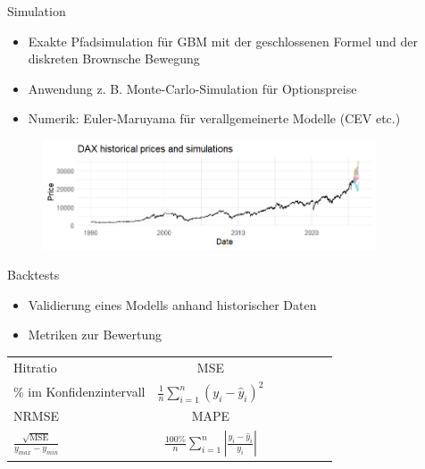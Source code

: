 \documentclass{beamer}
\begin{document}
\begin{frame}{Simulation}
  \begin{itemize}
      \item Exakte Pfadsimulation für GBM mit der geschlossenen Formel und der diskreten Brownsche Bewegung
      \item Anwendung z. B. Monte-Carlo-Simulation für Optionspreise
      \item Numerik: Euler-Maruyama für verallgemeinerte Modelle (CEV etc.)
  \end{itemize}
  \begin{figure}
    \centering
  \includegraphics[width=0.88\textwidth]{../thesis/images/dax_monte_carlo.png}
  \end{figure}
\end{frame}

\begin{frame}{Backtests}
  \begin{itemize}
      \item Validierung eines Modells anhand historischer Daten
      \item Metriken zur Bewertung
  
  \end{itemize}
\begin{table}[H]
\centering
\begin{tabular}{lcccccc}
Hitratio & MSE \\

\% im Konfidenzintervall & $\frac{1}{n} \sum_{i=1}^n (y_i - \hat{y}_i)^2$  \\
\hline
NRMSE & MAPE \\
$\frac{\sqrt{\text{MSE}}}{y_{max} - y_{min}}$ & $\frac{100\%}{n} \sum_{i=1}^n \left|\frac{y_i - \hat{y}_i}{y_i}\right|$ \\

\end{tabular}
\end{table}

\end{frame}
\end{document}
